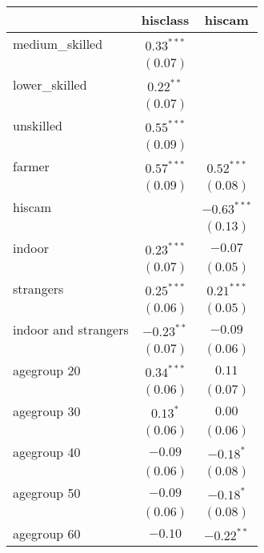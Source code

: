 
\begin{table}
\begin{center}
\begin{tabular}{l c c}
\hline
 & hisclass & hiscam \\
\hline
medium\_skilled      & $0.33^{***}$  &               \\
                     & $(0.07)$      &               \\
lower\_skilled       & $0.22^{**}$   &               \\
                     & $(0.07)$      &               \\
unskilled            & $0.55^{***}$  &               \\
                     & $(0.09)$      &               \\
farmer               & $0.57^{***}$  & $0.52^{***}$  \\
                     & $(0.09)$      & $(0.08)$      \\
hiscam               &               & $-0.63^{***}$ \\
                     &               & $(0.13)$      \\
indoor               & $0.23^{***}$  & $-0.07$       \\
                     & $(0.07)$      & $(0.05)$      \\
strangers            & $0.25^{***}$  & $0.21^{***}$  \\
                     & $(0.06)$      & $(0.05)$      \\
indoor and strangers & $-0.23^{**}$  & $-0.09$       \\
                     & $(0.07)$      & $(0.06)$      \\
agegroup 20          & $0.34^{***}$  & $0.11$        \\
                     & $(0.06)$      & $(0.07)$      \\
agegroup 30          & $0.13^{*}$    & $0.00$        \\
                     & $(0.06)$      & $(0.06)$      \\
agegroup 40          & $-0.09$       & $-0.18^{*}$   \\
                     & $(0.06)$      & $(0.08)$      \\
agegroup 50          & $-0.09$       & $-0.18^{*}$   \\
                     & $(0.06)$      & $(0.08)$      \\
agegroup 60          & $-0.10$       & $-0.22^{**}$  \\

\end{tabular}
\end{center}
\end{table}
